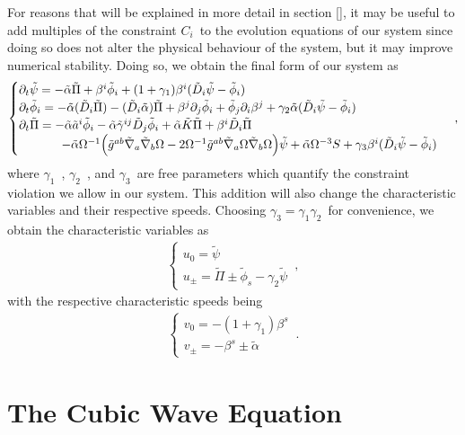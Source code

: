 For reasons that will be explained in more detail in section \ref{}, it may be useful to add multiples of the constraint $C_i$~to the evolution equations of our system since doing so does not alter the physical behaviour of the system, but it may improve numerical stability. Doing so, we obtain the final form of our system as
%
\begin{align}
    \begin{cases}
        \partial_t \tilde{\psi} = - \tilde{\alpha} \tilde{\Pi} + \beta^i \tilde{\phi}_i + (1 + \gamma_1) \beta^i (\tilde{D}_i \tilde{\psi} - \tilde{\phi}_i) \\
        \partial_t \tilde{\phi}_i = - \tilde{\alpha} (\tilde{D}_i \tilde{\Pi}) - (\tilde{D}_i \tilde{\alpha}) \tilde{\Pi} + \beta^j \partial_j \tilde{\phi}_i + \tilde{\phi}_j \partial_i \beta^j + \gamma_2 \tilde{\alpha} (\tilde{D}_i \tilde{\psi} - \tilde{\phi}_i) \\
        \partial_t \tilde{\Pi} = - \tilde{\alpha} \tilde{a}^i \tilde{\phi}_i - \tilde{\alpha} \tilde{\gamma}^{ij} \tilde{D}_j \tilde{\phi}_i + \tilde{\alpha} \tilde{K} \tilde{\Pi} + \beta^i \tilde{D}_i \tilde{\Pi} \\
        \hspace{3.5em} - \tilde{\alpha} \Omega^{-1} \Big( \tilde{g}^{ab} \tilde{\nabla}_a \tilde{\nabla}_b \Omega - 2 \Omega^{-1} \tilde{g}^{ab} \tilde{\nabla}_a \Omega \tilde{\nabla}_b \Omega \Big) \tilde{\psi} + \tilde{\alpha} \Omega^{-3} S + \gamma_3 \beta^i (\tilde{D}_i \tilde{\psi} - \tilde{\phi}_i)
    \end{cases}\,,
\end{align}
%
where $\gamma_1$~, $\gamma_2$~, and $\gamma_3$~are free parameters which quantify the constraint violation we allow in our system. This addition will also change the characteristic variables and their respective speeds. Choosing $\gamma_3 = \gamma_1 \gamma_2$~for convenience, we obtain the characteristic variables as
%
\begin{align}
    \begin{cases}
        u_0 = \tilde{\psi} \\
        u_\pm = \tilde{\Pi} \pm \tilde{\phi}_s - \gamma_2 \tilde{\psi}
    \end{cases}\,,
\end{align}
%
with the respective characteristic speeds being
%
\begin{align}
    \begin{cases}
        v_0 = - (1 + \gamma_1) \beta^s \\
        v_\pm = -\beta^s \pm \tilde{\alpha}
    \end{cases}\,.
\end{align}


\section{The Cubic Wave Equation}
\label{section:cubic_wave_equation}